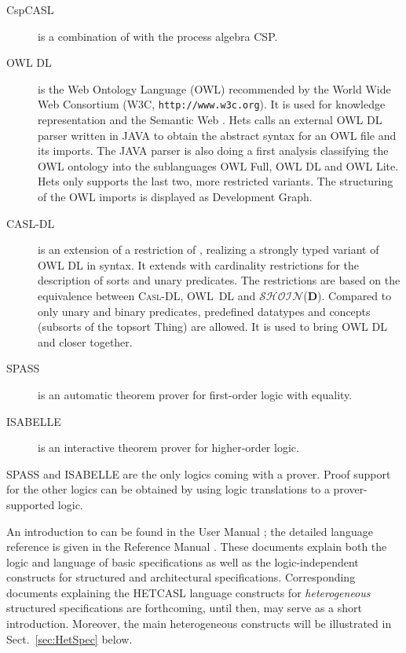 \documentclass{article}
\newcommand{\normalTEXTSC}[2]{{#1\scriptsize#2}}
\newcommand     {\Isabelle}{\normalTEXTSC{I}{SABELLE}\xspace}
\newcommand{\CASLDL}{\textmd{\textsc{Casl-DL}}\xspace}
\newcommand{\SHOIN}{$\mathcal{SHOIN}$(\textbf{D})\xspace}
\newcommand{\HetCASL}{\normalTEXTSC{H}{ET}\normalTEXTSC{C}{ASL}\xspace}
\begin{document}
\begin{description}
\item[CspCASL] \cite{Roggenbach:2003:C-CN} is a combination of \CASL
  with the process algebra CSP.

\item[OWL DL] is the Web Ontology Language (OWL) recommended by the
  World Wide Web Consortium (W3C, \texttt{http://www.w3c.org}). It is
  used for knowledge representation and the Semantic Web
  \cite{berners:2001:SWeb}. 
Hets calls an external OWL DL parser
  written in JAVA to obtain the abstract syntax for an OWL file and its
  imports. The JAVA parser is also doing a first analysis classifying
  the OWL ontology into the sublanguages OWL Full, OWL DL and OWL
  Lite. 
 Hets only supports the last two, more restricted variants. 
The
  structuring of the OWL imports is displayed as Development Graph.

\item[CASL-DL] is an extension of a restriction of \CASL, realizing
a strongly typed variant of OWL DL in \CASL syntax.
It extends
  \CASL with cardinality restrictions for the description of sorts and
  unary predicates. The restrictions are based on the equivalence
  between \CASLDL, OWL~DL and \SHOIN. Compared to \CASL only unary
  and binary predicates, predefined datatypes and concepts (subsorts
  of the topsort Thing) are allowed. It is used to bring OWL DL and
  \CASL closer together.

\item[SPASS] \cite{WeidenbachEtAl02} is an automatic theorem prover for first-order logic
with equality.

\item[\Isabelle] \cite{NipPauWen02} is an interactive theorem prover for higher-order
logic.
\end{description}
SPASS and \Isabelle are the only logics coming with a prover. Proof
support for the other logics can be obtained by using logic translations
to a prover-supported logic.


An introduction to \CASL can be found in the \CASL User Manual
\cite{CASL/UserManual}; the detailed language reference is given in
the \CASL Reference Manual \cite{CASL/RefManual}.  These documents
explain both the \CASL logic and language of basic specifications as
well as the logic-independent constructs for structured and
architectural specifications.  Corresponding documents explaining the
\HetCASL language constructs for \emph{heterogeneous} structured specifications
are forthcoming, until then, \cite{Mossakowski:2003:FHS} may serve as a short
introduction. Moreover, the main heterogeneous constructs will be illustrated 
in Sect.~\ref{sec:HetSpec} below.
\end{document}

